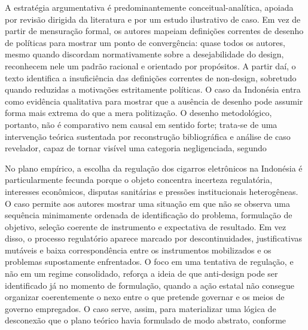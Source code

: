 \documentclass[12pt,a4paper]{article}
\begin{document}
A estratégia argumentativa é predominantemente conceitual-analítica, apoiada por revisão dirigida da literatura e por um estudo ilustrativo de caso. Em vez de partir de mensuração formal, os autores mapeiam definições correntes de desenho de políticas para mostrar um ponto de convergência: quase todos os autores, mesmo quando discordam normativamente sobre a desejabilidade do design, reconhecem nele um padrão racional e orientado por propósitos. A partir daí, o texto identifica a insuficiência das definições correntes de non-design, sobretudo quando reduzidas a motivações estritamente políticas. O caso da Indonésia entra como evidência qualitativa para mostrar que a ausência de desenho pode assumir forma mais extrema do que a mera politização. O desenho metodológico, portanto, não é comparativo nem causal em sentido forte; trata-se de uma intervenção teórica sustentada por reconstrução bibliográfica e análise de caso revelador, capaz de tornar visível uma categoria negligenciada, segundo\parencite{newman2020_policy_design}

No plano empírico, a escolha da regulação dos cigarros eletrônicos na Indonésia é particularmente fecunda porque o objeto concentra incerteza regulatória, interesses econômicos, disputas sanitárias e pressões institucionais heterogêneas. O caso permite aos autores mostrar uma situação em que não se observa uma sequência minimamente ordenada de identificação do problema, formulação de objetivo, seleção coerente de instrumento e expectativa de resultado. Em vez disso, o processo regulatório aparece marcado por descontinuidades, justificativas mutáveis e baixa correspondência entre os instrumentos mobilizados e os problemas supostamente enfrentados. O foco em uma tentativa de regulação, e não em um regime consolidado, reforça a ideia de que anti-design pode ser identificado já no momento de formulação, quando a ação estatal não consegue organizar coerentemente o nexo entre o que pretende governar e os meios de governo empregados. O caso serve, assim, para materializar uma lógica de desconexão que o plano teórico havia formulado de modo abstrato, conforme\parencite{newman2020_policy_design}
\end{document}
